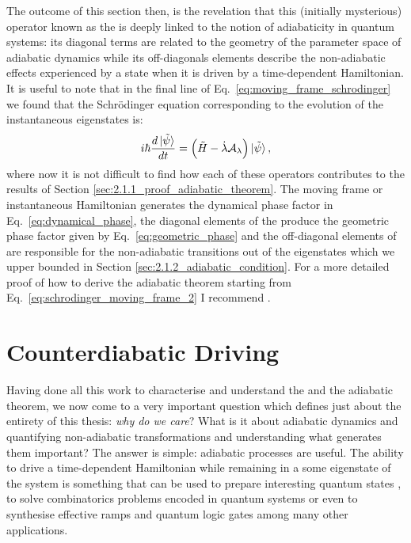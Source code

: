     The outcome of this section then, is the revelation that this (initially mysterious) operator known as the  is deeply linked to the notion of adiabaticity in quantum systems: its diagonal terms are related to the geometry of the parameter space of adiabatic dynamics while its off-diagonals elements describe the non-adiabatic effects experienced by a state when it is driven by a time-dependent Hamiltonian. It is useful to note that in the final line of Eq.~\eqref{eq:moving_frame_schrodinger} we found that the Schr\"{o}dinger equation corresponding to the evolution of the instantaneous eigenstates is:
    \begin{equation}\label{eq:schrodinger_moving_frame_2}
        i \hbar \frac{d \ket*{\Tilde{\psi}}}{dt} = \Big( \Tilde{H} - \dot{\lambda} \mathcal{A}_{\lambda} \Big) \ket*{\Tilde{\psi}},
    \end{equation}
    where now it is not difficult to find how each of these operators contributes to the results of Section \ref{sec:2.1.1_proof_adiabatic_theorem}. The moving frame or instantaneous Hamiltonian generates the dynamical phase factor in Eq.~\eqref{eq:dynamical_phase}, the diagonal elements of the  produce the geometric phase factor given by Eq.~\eqref{eq:geometric_phase} and the off-diagonal elements of  are responsible for the non-adiabatic transitions out of the eigenstates which we upper bounded in Section \ref{sec:2.1.2_adiabatic_condition}. For a more detailed proof of how to derive the adiabatic theorem starting from Eq.~\eqref{eq:schrodinger_moving_frame_2} I recommend \cite{petiziol_accelerated_2020}. 
    
    \section{Counterdiabatic Driving}\label{sec:2.3_CD}

    Having done all this work to characterise and understand the  and the adiabatic theorem, we now come to a very important question which defines just about the entirety of this thesis: \emph{why do we care}? What is it about adiabatic dynamics and quantifying non-adiabatic transformations and understanding what generates them important? The answer is simple: adiabatic processes are useful. The ability to drive a time-dependent Hamiltonian while remaining in a some eigenstate of the system is something that can be used to prepare interesting quantum states \cite{dimitrova_many-body_2022}, to solve combinatorics problems encoded in quantum systems \cite{ebadi_quantum_2022, pichler_quantum_2018} or even to synthesise effective ramps and quantum logic gates \cite{pelegri_high-fidelity_2022} among many other applications. 
    
